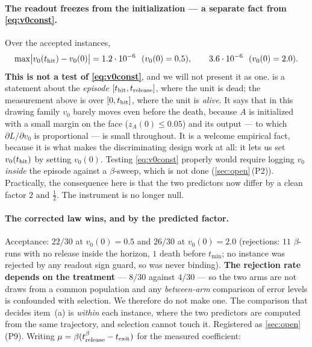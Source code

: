 
\paragraph{The readout freezes from the initialization --- a separate fact from
\eqref{eq:v0const}.}
Over the accepted instances,
\[
\max\bigl|v_0(t_{\mathrm{hit}})-v_0(0)\bigr|
=1.2\cdot10^{-6}\ \ (v_0(0)=0.5),
\qquad
3.6\cdot10^{-6}\ \ (v_0(0)=2.0).
\]
\textbf{This is not a test of \eqref{eq:v0const}}, and we will not present it as
one.  is a statement about the \emph{episode}
$[t_{\mathrm{hit}},t_{\mathrm{release}}]$, where the unit is dead; the measurement above is over
$[0,t_{\mathrm{hit}}]$, where the unit is \emph{alive}. It says that in this drawing family
$v_0$ barely moves even before the death, because $A$ is initialized with a
small margin on the face ($z_A(0)\le0.05$) and its output --- to which
$\partial L/\partial v_0$ is proportional --- is small throughout. It is a
welcome empirical fact, because it is what makes the discriminating design work
at all: it lets us set $v_0(t_{\mathrm{hit}})$ by setting $v_0(0)$. Testing
\eqref{eq:v0const} properly would require logging $v_0$ \emph{inside} the
episode against a $\beta$-sweep, which is not done (\cref{sec:open}\,(P2)).
Practically, the consequence here is that the two predictors now differ by a
clean factor $2$ and $\tfrac12$. The instrument is no longer null.

\paragraph{The corrected law wins, and by the predicted factor.}
Acceptance: $22/30$ at $v_0(0)=0.5$ and $26/30$ at $v_0(0)=2.0$ (rejections: $11$
$\beta$-runs with no release inside the horizon, $1$ death before $t_{\min}$; no
instance was rejected by any readout sign guard, so  was never
binding). \textbf{The rejection rate depends on the treatment} --- $8/30$ against
$4/30$ --- so the two arms are not draws from a common population and any
\emph{between-arm} comparison of error levels is confounded with selection. We
therefore do not make one. The comparison that decides item~(a) is
\emph{within} each instance, where the two predictors are computed from the same
trajectory, and selection cannot touch it. Registered as
\cref{sec:open}\,(P9). Writing
$\mu=\beta(t^\beta_{\rm release}-t_{\mathrm{exit}})$ for the measured coefficient:

